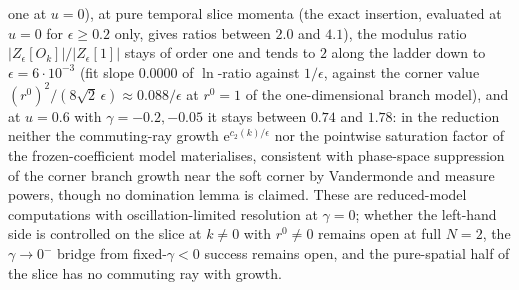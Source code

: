 one at \(u=0\)), at pure temporal slice momenta (the exact insertion, evaluated at \(u=0\) for \(\epsilon\ge0.2\) only, gives ratios between \(2.0\) and \(4.1\)), the modulus ratio \(|Z_\epsilon[O_k]|/|Z_\epsilon[1]|\) stays of order one and tends to \(2\) along the ladder down to \(\epsilon=6\cdot10^{-3}\) (fit slope \(0.0000\) of \(\ln\)-ratio against \(1/\epsilon\), against the corner value \({(r^0)}^2/(8\sqrt2\,\epsilon)\approx0.088/\epsilon\) at \(r^0=1\) of the one-dimensional branch model), and at \(u=0.6\) with \(\gamma=-0.2,-0.05\) it stays between \(0.74\) and \(1.78\): in the reduction neither the commuting-ray growth \(\mathrm e^{c_2(k)/\epsilon}\) nor the pointwise saturation factor of the frozen-coefficient model materialises, consistent with phase-space suppression of the corner branch growth near the soft corner by Vandermonde and measure powers, though no domination lemma is claimed. These are reduced-model computations with oscillation-limited resolution at \(\gamma=0\); whether the left-hand side is controlled on the slice at \(k\ne0\) with \(r^0\ne0\) remains open at full \(N=2\), the \(\gamma\to0^-\) bridge from fixed-\(\gamma<0\) success remains open, and the pure-spatial half of the slice has no commuting ray with growth.
